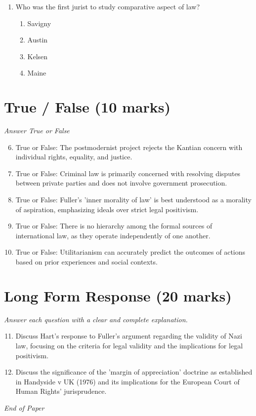 \documentclass[12pt]{article}
\begin{document}
\begin{enumerate}[label=\arabic*.]
\begin{enumerate}[label=(\alph*)]
    \item Both are concerned with the 'law in action.'
    \item Both are anti-formalist and sceptical
    \item Both adopt a liberal ideology.
    \item Both attempt to demystify the law.
\end{enumerate}
\item Who was the first jurist to study comparative aspect of law?
\begin{enumerate}[label=(\alph*)]
    \item Savigny
    \item Austin
    \item Kelsen
    \item Maine
\end{enumerate}
\end{enumerate}

\section*{True / False (10 marks)}
\textit{Answer True or False}
\begin{enumerate}[label=\arabic*.]
\setcounter{enumi}{5}
\item True or False: The postmodernist project rejects the Kantian concern with individual rights, equality, and justice.
\item True or False: Criminal law is primarily concerned with resolving disputes between private parties and does not involve government prosecution.
\item True or False: Fuller's 'inner morality of law' is best understood as a morality of aspiration, emphasizing ideals over strict legal positivism.
\item True or False: There is no hierarchy among the formal sources of international law, as they operate independently of one another.
\item True or False: Utilitarianism can accurately predict the outcomes of actions based on prior experiences and social contexts.
\end{enumerate}

\section*{Long Form Response (20 marks)}
\textit{Answer each question with a clear and complete explanation.}
\begin{enumerate}[label=\arabic*.]
\setcounter{enumi}{10}
\item Discuss Hart's response to Fuller's argument regarding the validity of Nazi law, focusing on the criteria for legal validity and the implications for legal positivism.
\item Discuss the significance of the 'margin of appreciation' doctrine as established in Handyside v UK (1976) and its implications for the European Court of Human Rights' jurisprudence.
\end{enumerate}

\vfill
\noindent\textit{End of Paper}
\end{document}
